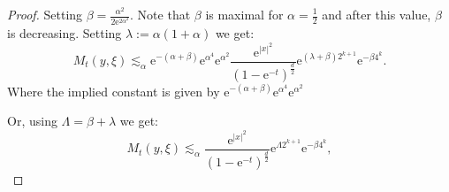 \documentclass[a4paper,oneside,10pt]{amsproc}
\theoremstyle{remark}
\newcommand{\e}{\mathrm{e}} %
\begin{document}
\begin{proof}
  Setting $\beta = \frac{\alpha^2}{2 \e^{2\alpha^2}}$. Note that $\beta$
  is maximal for $\alpha = \frac12$ and after this value, $\beta$ is decreasing.
  Setting $\lambda := \alpha(1 + \alpha)$ we get:
  \begin{equation}
    \label{eq:Mehler-kernel-estimate-one-sided-bound-2}
    M_t(y, \xi) \lesssim_\alpha  \e^{-(\alpha + \beta)} \e^{\alpha^4} \e^{\alpha^2} \frac{ \e^{|x|^2} }{(1 - \e^{-t})^{\frac{d}2}} \e^{(\lambda + \beta) 2^{k + 1}} \e^{-\beta 4^k}.
  \end{equation}
  Where the implied constant is given by $\e^{-(\alpha + \beta)} \e^{\alpha^4} \e^{\alpha^2}$

  Or, using $\Lambda = \beta + \lambda$ we get:
  \begin{equation}
    \label{eq:Mehler-kernel-estimate-one-sided-bound-2}
    M_t(y, \xi) \lesssim_\alpha \frac{\e^{|x|^2}}{(1
      - \e^{-t})^{\frac{d}2}} \e^{\Lambda 2^{k + 1}}
    \e^{-\beta 4^k},
  \end{equation}


\end{proof}
\end{document}
